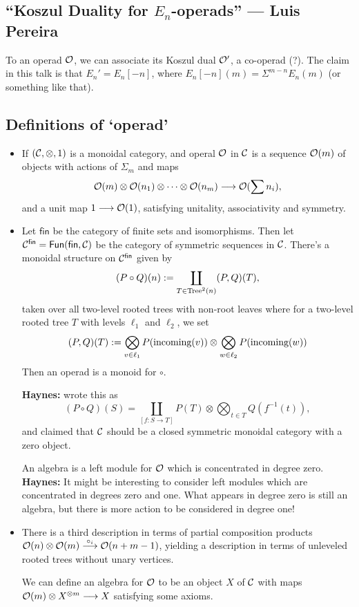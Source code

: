 \documentclass[11pt]{article}
\newcommand{\KanSemResponse}[1]
{
\thispagestyle{fancy}
\subsection*{#1}
}
\begin{document}
\begin{LuisKoszulDuality}
\KanSemResponse
{``Koszul Duality for $E_n$-operads'' --- Luis Pereira}
To an operad $\mathcal{O}$, we can associate its Koszul dual $\mathcal{O}'$, a co-operad (?). The claim in this talk is that $E_n'=E_n[-n]$, where $E_n[-n](m)=\Sigma^{m-n}E_n(m)$ (or something like that).
\subsection*{Definitions of `operad'}
\begin{itemize}\squishlist
\item If $(\mathcal{C},\otimes,1)$ is a monoidal category, and operal $\mathcal{O}$ in $\mathcal{C}$ is a sequence $\mathcal{O}(m)$ of objects with actions of $\Sigma_m$ and maps
\[\mathcal{O}(m)\otimes\mathcal{O}(n_1)\otimes\cdots\otimes\mathcal{O}(n_m)\longrightarrow\mathcal{O}(\sum n_i),\]
and a unit map $1\longrightarrow\mathcal{O}(1)$, satisfying unitality, associativity and symmetry.
\item 
Let $\mathsf{fin}$ be the category of finite sets and isomorphisms. Then let $\mathcal{C}^{\mathsf{fin}}=\operatorname{{\mathsf{Fun}}}(\mathsf{fin},\mathcal{C})$ be the category of symmetric sequences in $\mathcal{C}$. There's a monoidal structure on $\mathcal{C}^{\mathsf{fin}}$ given by
\[(P\circ Q)(n):=\coprod_{T\in\textup{Tree}^2(n)}(P,Q)(T),\]
taken over all two-level rooted trees with non-root leaves 
where for a two-level rooted tree $T$ with levels $\ell_1$ and $\ell_2$, we set \[(P,Q)(T):=\bigotimes_{v\in\ell_1}P(\textup{incoming}(v))\otimes\bigotimes_{w\in\ell_2}P(\textup{incoming}(w))\]
Then an operad is a monoid for $\circ$.

\textbf{Haynes:} wrote this as
\[(P\circ Q)(S)=
\coprod_{[f:S\to T]}P(T)\otimes\bigotimes_{t\in T}Q(f^{-1}(t)),\]
and claimed that $\mathcal{C}$ should be a closed symmetric monoidal category with a zero object.

An algebra is a left module for $\mathcal{O}$ which is concentrated in degree zero. \textbf{Haynes:} It might be interesting to consider left modules which are concentrated in degrees zero and one. What appears in degree zero is still an algebra, but there is more action to be considered in degree one!

\item There is a third description in terms of partial composition products $\mathcal{O}(n)\otimes\mathcal{O}(m)\overset{\circ_i}{\longrightarrow}\mathcal{O}(n+m-1)$, yielding a description in terms of unleveled rooted trees without unary vertices.

We can define an algebra for $\mathcal{O}$ to be an object $X$ of $\mathcal{C}$ with maps $\mathcal{O}(m)\otimes X^{\otimes m}\longrightarrow X$ satisfying some axioms.
\end{itemize}











\pagebreak
\end{LuisKoszulDuality}
\end{document}
